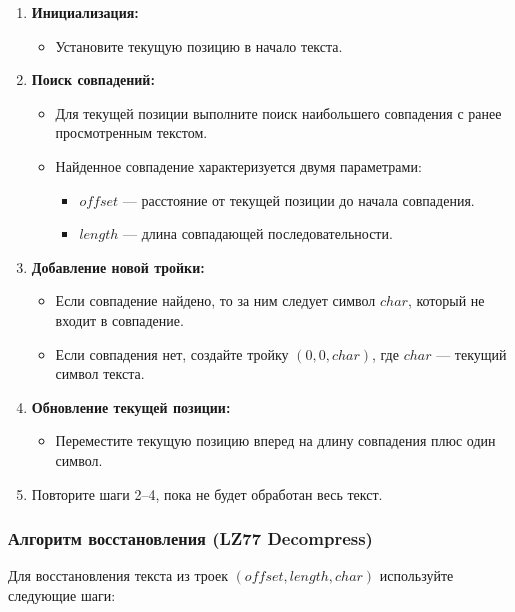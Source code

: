\begin{enumerate}
  \item \textbf{Инициализация:}
    \begin{itemize}
      \item Установите текущую позицию в начало текста.
    \end{itemize}

  \item \textbf{Поиск совпадений:}
    \begin{itemize}
      \item Для текущей позиции выполните поиск наибольшего совпадения с ранее просмотренным текстом.
      \item Найденное совпадение характеризуется двумя параметрами:
        \begin{itemize}
          \item $offset$ --- расстояние от текущей позиции до начала совпадения.
          \item $length$ --- длина совпадающей последовательности.
        \end{itemize}
    \end{itemize}

  \item \textbf{Добавление новой тройки:}
    \begin{itemize}
      \item Если совпадение найдено, то за ним следует символ $char$, который не входит в совпадение.
      \item Если совпадения нет, создайте тройку $(0, 0, char)$, где $char$ --- текущий символ текста.
    \end{itemize}

  \item \textbf{Обновление текущей позиции:}
    \begin{itemize}
      \item Переместите текущую позицию вперед на длину совпадения плюс один символ.
    \end{itemize}

  \item Повторите шаги 2--4, пока не будет обработан весь текст.
\end{enumerate}

\subsubsection*{Алгоритм восстановления (LZ77 Decompress)}

Для восстановления текста из троек $(offset, length, char)$ используйте следующие шаги:

